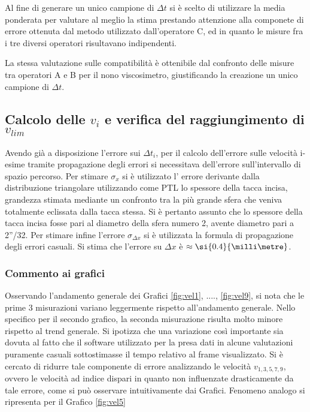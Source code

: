 \documentclass[a4paper,11pt,oneside]{article}
\begin{document}
Al fine di generare un unico campione di $\Delta t$ si è scelto di utilizzare la media ponderata per valutare al meglio la stima prestando attenzione alla componete di errore ottenuta dal metodo utilizzato dall'operatore C, ed in quanto le misure fra i tre diversi operatori risultavano indipendenti.\newline

La stessa valutazione sulle compatibilità è ottenibile dal confronto delle misure tra operatori A e B per il nono viscosimetro, giustificando la creazione un unico campione di $\Delta t$.

\subsection{Calcolo delle $v_i$ e verifica del raggiungimento di $v_{lim}$}
Avendo già a disposizione l'errore sui $\Delta t_{i}$, per il calcolo dell'errore sulle velocità i-esime tramite propagazione degli errori si necessitava dell'errore sull'intervallo di spazio percorso. Per stimare $\sigma_x$ si è utilizzato l' errore derivante dalla distribuzione triangolare utilizzando come PTL lo spessore della tacca incisa, grandezza stimata mediante un confronto tra la più grande sfera che veniva totalmente eclissata dalla tacca stessa. Si è pertanto assunto che lo spessore della tacca incisa fosse pari al diametro della sfera numero 2, avente diametro pari a 2''/32. Per stimare infine l'errore $\sigma_{\Delta x}$ si è utilizzata la formula di propagazione degli errori casuali.  Si stima che l'errore su $\Delta x$ è $\approx \si{0.4}{\milli\metre}$.\\

\subsubsection*{Commento ai grafici}
Osservando l'andamento generale dei Grafici \ref{fig:vel1}, ...., \ref{fig:vel9}, si nota che le prime 3 misurazioni variano leggermente rispetto all'andamento generale. Nello specifico per il secondo grafico, la seconda misurazione risulta molto minore rispetto al trend generale. Si ipotizza che una variazione così importante sia dovuta al fatto che il software utilizzato per la presa dati in alcune valutazioni puramente casuali sottostimasse il tempo relativo al frame visualizzato.
Si è cercato di ridurre tale componente di errore analizzando le velocità $v_{1, 3, 5, 7, 9}$, ovvero le velocità ad indice dispari in quanto non influenzate drasticamente da tale errore, come si può osservare intuitivamente dai Grafici. Fenomeno analogo si ripresenta per il Grafico \ref{fig:vel5}
\end{document}
